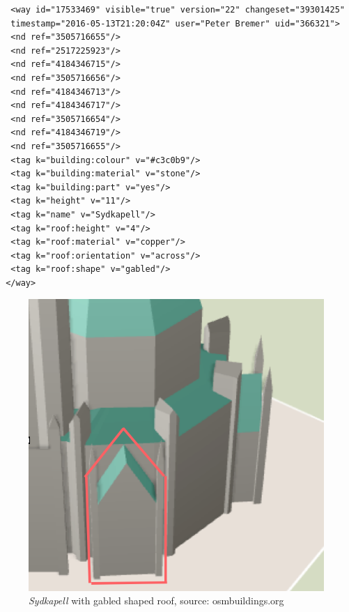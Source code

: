 \begin{lstlisting}
  <way id="17533469" visible="true" version="22" changeset="39301425" 
  timestamp="2016-05-13T21:20:04Z" user="Peter Bremer" uid="366321">
  <nd ref="3505716655"/>
  <nd ref="2517225923"/>
  <nd ref="4184346715"/>
  <nd ref="3505716656"/>
  <nd ref="4184346713"/>
  <nd ref="4184346717"/>
  <nd ref="3505716654"/>
  <nd ref="4184346719"/>
  <nd ref="3505716655"/>
  <tag k="building:colour" v="#c3c0b9"/>
  <tag k="building:material" v="stone"/>
  <tag k="building:part" v="yes"/>
  <tag k="height" v="11"/>
  <tag k="name" v="Sydkapell"/>
  <tag k="roof:height" v="4"/>
  <tag k="roof:material" v="copper"/>
  <tag k="roof:orientation" v="across"/>
  <tag k="roof:shape" v="gabled"/>
 </way>
\end{lstlisting}

\begin{figure}[H]
    \centering
    \includegraphics[scale=0.5]{figures/FixedByMe/nidaros3D.png}
    \caption{\textit{Sydkapell} with gabled shaped roof, source: osmbuildings.org}
    \label{fig:erkeinng}
\end{figure} 